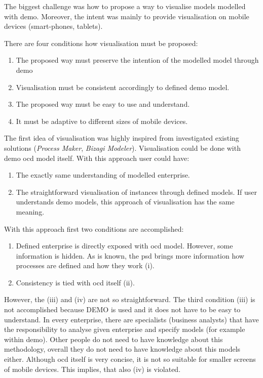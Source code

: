 The biggest challenge was how to propose a way to visualise models modelled with \gls{demo}. Moreover, the intent was mainly to provide visualisation on mobile devices (smart-phones, tablets).

There are four conditions how visualisation must be proposed:
\begin{enumerate}[i]
    \item The proposed way must preserve the intention of the modelled model through \gls{demo}
    \item Visualisation must be consistent accordingly to defined \gls{demo} model.
    \item The proposed way must be easy to use and understand.  
    \item It must be adaptive to different sizes of mobile devices. 
\end{enumerate}

The first idea of visualisation was highly inspired from investigated existing solutions (\textit{Process Maker}, \textit{Bizagi Modeler}). Visualisation could be done with \gls{demo} \gls{ocd} model itself. With this approach user could have:
\begin{enumerate}
  \item The exactly same understanding of modelled enterprise.
  \item The straightforward visualisation of instances through defined models. If user understands \gls{demo} models, this approach of visualisation has the same meaning.
\end{enumerate}

With this approach first two conditions are accomplished:
\begin{enumerate}
\item Defined enterprise is directly exposed with \gls{ocd} model. However, some information is hidden. As is known, the \gls{psd} brings more information how processes are defined and how they work (i). 
\item Consistency is tied with \gls{ocd} itself (ii).
\end{enumerate}

However, the (iii) and (iv) are not so straightforward. The third condition (iii) is not accomplished because DEMO is used and it does not have to be easy to understand. In every enterprise, there are specialists (business analysts) that have the responsibility to analyse given enterprise and specify models (for example within \gls{demo}). Other people do not need to have knowledge about this methodology, overall they do not need to have knowledge about this models either. Although \gls{ocd} itself is very concise, it is not so suitable for smaller screens of mobile devices. This implies, that also (iv) is violated.
